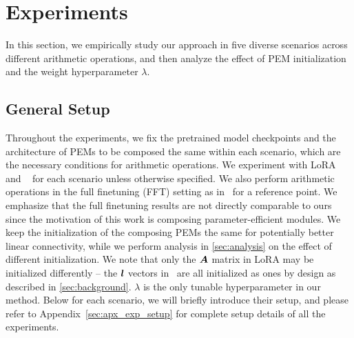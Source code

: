 \section{Experiments}
\label{sec:exp}
In this section, we empirically study our approach in five diverse scenarios across different arithmetic operations, and then analyze the effect of PEM initialization and the weight hyperparameter $\lambda$.
\subsection{General Setup}
Throughout the experiments, we fix the pretrained model checkpoints and the architecture of PEMs to be composed the same within each scenario, which are the necessary conditions for arithmetic operations. 
We experiment with LoRA and \ia~ for each scenario unless otherwise specified. We also perform arithmetic operations in the full finetuning (FFT) setting as in~\citet{ilharco2022editing} for a reference point. 
We emphasize that the full finetuning results are not directly comparable to ours since the motivation of this work is composing parameter-efficient modules.
We keep the initialization of the composing PEMs the same for potentially better linear connectivity, while we perform analysis in \textsection\ref{sec:analysis} on the effect of different initialization.
We note that only the ${\bm{A}}$ matrix in LoRA may be initialized differently -- the ${\bm{l}}$ vectors in \ia~are all initialized as ones by design as described in \textsection\ref{sec:background}. 
$\lambda$ is the only tunable hyperparameter in our method.
Below for each scenario, we will briefly introduce their setup, and please refer to Appendix~\ref{sec:apx_exp_setup} for complete setup details of all the experiments.

